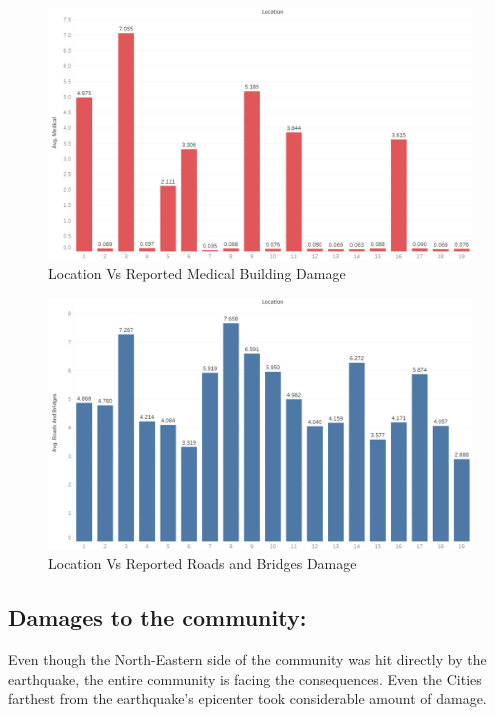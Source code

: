 \documentclass[12pt]{extarticle}
\begin{document}
\begin{figure}[H]
\centering
	\includegraphics[width=\linewidth]{Images/medical.png}
	\caption{Location Vs Reported Medical Building Damage }
	\label{fig:medical}
\end{figure}

\begin{figure}[H]
\centering
	\includegraphics[width=\linewidth]{Images/Road.png}
	\caption{Location Vs Reported Roads and Bridges Damage }
	\label{fig:road}
\end{figure}
 
 
 \subsection{Damages to the community:}
 \label{subsec:damage}
 Even though the North-Eastern side of the community was hit directly by the earthquake, the entire community is facing the consequences. Even the Cities farthest from the earthquake\rq{}s epicenter took considerable amount of damage. 
 
\end{document}
